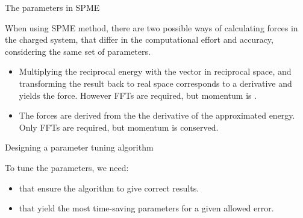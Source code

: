 \documentclass[final,hyperref={pdfpagelabels=false}]{beamer}
\begin{document}
\begin{frame}{}
\begin{columns}[t]
\begin{column}{.32\linewidth}
\begin{block}{\large The parameters in SPME}
\begin{minipage}[c]{.975\linewidth}
          When using SPME method, there are two possible ways of
          calculating forces in the charged system, that differ in the
          computational effort and accuracy, considering the same set of
          parameters.
          \vspace*{-0.5ex}
          \begin{itemize}
            \item {}\vspace{0.4ex}
              \begin{minipage}{0.975\textwidth} 
                Multiplying the reciprocal energy with the vector  in
                reciprocal space, and transforming the result back to real
                space corresponds to a derivative and yields the force. However
                 FFTs are required, but momentum is .
              \end{minipage}\vspace*{0.2ex}
            \item {}\vspace{0.4ex}
            \begin{minipage}{0.975\textwidth}
            The forces are derived from the the derivative of the approximated
            energy. Only  FFTs are required, but momentum is 
            conserved.
            \vspace*{-0.2ex}
        \end{minipage}
          \end{itemize}
        \end{minipage}
        \end{block}
        \vfill
        \begin{block}{\large Designing a parameter tuning algorithm}
          \vspace{1ex}
          \begin{minipage}[c]{.975\linewidth}
          To tune the parameters, we need:
          \begin{itemize}\justifying
          \item {} that ensure the algorithm to give
            correct results. 
          \item {} that yield the most time-saving
            parameters for a given allowed error.
          \end{itemize}
        \end{minipage}
        \end{block}

\end{column}
\end{columns}
\end{frame}
\end{document}
